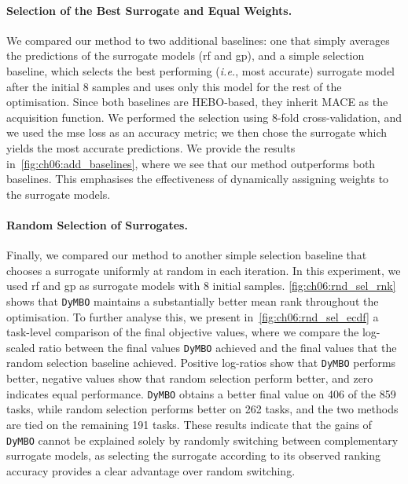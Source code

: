 \paragraph{Selection of the Best Surrogate and Equal Weights.}
We compared our method to two additional baselines: one that simply averages the predictions of the surrogate models (\gls{rf} and \gls{gp}), and a simple selection baseline, which selects the best performing (\emph{i.e.}, most accurate) surrogate model after the initial 8 samples and uses only this model for the rest of the optimisation.
Since both baselines are HEBO-based, they inherit MACE as the acquisition function.
We performed the selection using 8-fold cross-validation, and we used the \gls{mse} loss as an accuracy metric; we then chose the surrogate which yields the most accurate predictions.
We provide the results in~\cref{fig:ch06:add_baselines}, where we see that our method outperforms both baselines. This emphasises the effectiveness of dynamically assigning weights to the surrogate models.

\paragraph{Random Selection of Surrogates.}
Finally, we compared our method to another simple selection baseline that chooses a surrogate uniformly at random in each iteration.
In this experiment, we used \gls{rf} and \gls{gp} as surrogate models with 8 initial samples.
\cref{fig:ch06:rnd_sel_rnk} shows that \texttt{DyMBO} maintains a substantially better mean rank throughout the optimisation. To further analyse this, we present in~\cref{fig:ch06:rnd_sel_ecdf} a task-level comparison of the final objective values, where we compare the log-scaled ratio between the final values \texttt{DyMBO} achieved and the final values that the random selection baseline achieved. Positive log-ratios show that \texttt{DyMBO} performs better, negative values show that random selection perform better, and zero indicates equal performance. \texttt{DyMBO} obtains a better final value on 406 of the 859 tasks, while random selection performs better on 262 tasks, and the two methods are tied on the remaining 191 tasks. These results indicate that the gains of \texttt{DyMBO} cannot be explained solely by randomly switching between complementary surrogate models, as selecting the surrogate according to its observed ranking accuracy provides a clear advantage over random switching.


